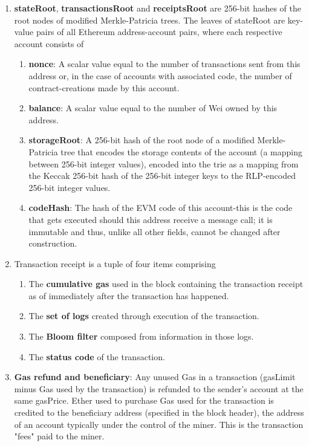 \begin{enumerate}
\item\textbf{stateRoot}, \textbf{transactionsRoot} and \textbf{receiptsRoot} are 256-bit hashes of the root nodes of modified Merkle-Patricia trees. The leaves of stateRoot are key-value pairs of all Ethereum address-account pairs, where each respective account consists of
\begin{enumerate}
\item\textbf{nonce}: A scalar value equal to the number of transactions sent from this address or, in the case of accounts with associated code, the number of contract-creations made by this account.
\item\textbf{balance}: A scalar value equal to the number of Wei owned by this address.
\item\textbf{storageRoot}: A 256-bit hash of the root node of a modified Merkle-Patricia tree that encodes the storage contents of the account (a mapping between 256-bit integer values), encoded into the trie as a mapping from the Keccak 256-bit hash of the 256-bit integer keys to the RLP-encoded 256-bit integer values.
\item\textbf{codeHash}: The hash of the EVM code of this account-this is the code that gets executed should this address receive a message call; it is immutable and thus, unlike all other fields, cannot be changed after construction.
\end{enumerate}

\item Transaction receipt is a tuple of four items comprising
\begin{enumerate}
\item The \textbf{cumulative gas} used in the block containing the transaction receipt as of immediately after the transaction has happened.
\item The \textbf{set of logs} created through execution of the transaction.
\item The \textbf{Bloom filter} composed from information in those logs.
\item The \textbf{status code} of the transaction.
\end{enumerate}

\item\textbf{Gas refund and beneficiary}: Any unused Gas in a transaction (gasLimit minus Gas used by the transaction) is refunded to the sender's account at the same gasPrice. Ether used to purchase Gas used for the transaction is credited to the beneficiary address (specified in the block header), the address of an account typically under the control of the miner. This is the transaction "fees" paid to the miner.


\end{enumerate}
